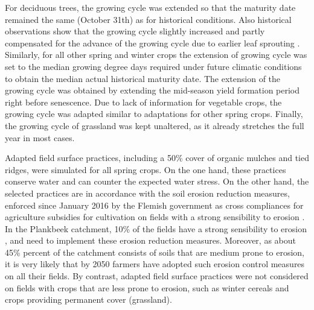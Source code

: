 For deciduous trees, the growing cycle was extended so that the maturity date remained the same (October 31th) as for historical conditions. Also historical observations show that the growing cycle slightly increased and partly compensated for the advance of the growing cycle due to earlier leaf sprouting \parencite{chmielewski2001,vitasse2011}. Similarly, for all other spring and winter crops the extension of growing cycle was set to the median growing degree days required under future climatic conditions to obtain the median actual historical maturity date. The extension of the growing cycle was obtained by extending the mid-season yield formation period right before senescence. Due to lack of information for vegetable crops, the growing cycle was adapted similar to adaptations for other spring crops. Finally, the growing cycle of grassland was kept unaltered, as it already stretches the full year in most cases. 

Adapted field surface practices, including a 50\% cover of organic mulches and tied ridges, were simulated for all spring crops. On the one hand, these practices conserve water and can counter the expected water stress. On the other hand, the selected practices are in accordance with the soil erosion reduction measures, enforced since January 2016 by the Flemish government as cross compliances for agriculture subsidies for cultivation on fields with a strong sensibility to erosion \parencite{lvvlaanderen2016}. In the Plankbeek catchment, 10\% of the fields have a strong sensibility to erosion \parencite{dov2016}, and need to implement these erosion reduction measures. Moreover, as about 45\% percent of the catchment consists of soils that are medium prone to erosion, it is very likely that by 2050 farmers have adopted such erosion control measures on all their fields. By contrast, adapted field surface practices were not considered on fields with crops that are less prone to erosion, such as winter cereals and crops providing permanent cover (grassland).

